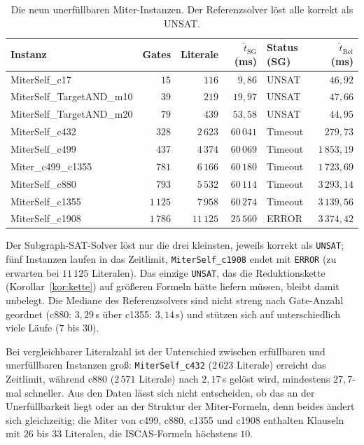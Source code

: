\begin{table}[!ht]
	\centering
	\small
	\begin{tabularx}{\textwidth}{@{}lrrrYr@{}}
		\toprule
		Instanz & Gates & Literale & $\tilde t_{\mathrm{SG}}$ (ms) & Status (SG) & $\tilde t_{\mathrm{Ref}}$ (ms) \\
		\midrule
		MiterSelf\_c17 & $15$ & $116$ & $9{,}86$ & UNSAT & $46{,}92$ \\
		MiterSelf\_TargetAND\_m10 & $39$ & $219$ & $19{,}97$ & UNSAT & $47{,}66$ \\
		MiterSelf\_TargetAND\_m20 & $79$ & $439$ & $53{,}58$ & UNSAT & $44{,}95$ \\
		MiterSelf\_c432 & $328$ & $2\,623$ & $60\,041$ & Timeout & $279{,}73$ \\
		MiterSelf\_c499 & $437$ & $4\,374$ & $60\,069$ & Timeout & $1\,853{,}19$ \\
		Miter\_c499\_c1355 & $781$ & $6\,166$ & $60\,180$ & Timeout & $1\,723{,}69$ \\
		MiterSelf\_c880 & $793$ & $5\,532$ & $60\,114$ & Timeout & $3\,293{,}14$ \\
		MiterSelf\_c1355 & $1\,125$ & $7\,958$ & $60\,274$ & Timeout & $3\,139{,}56$ \\
		MiterSelf\_c1908 & $1\,786$ & $11\,125$ & $25\,560$ & ERROR & $3\,374{,}42$ \\
		\bottomrule
	\end{tabularx}
	\caption{Die neun unerfüllbaren Miter-Instanzen. Der Referenzsolver löst alle korrekt als UNSAT.}
	\label{tab:exp_miter}
\end{table}

Der Subgraph-SAT-Solver löst nur die drei kleinsten, jeweils korrekt als \texttt{UNSAT}; fünf Instanzen laufen in das Zeitlimit, \texttt{MiterSelf\_c1908} endet mit \texttt{ERROR} (zu erwarten bei $11\,125$ Literalen). Das einzige \texttt{UNSAT}, das die Reduktionskette (Korollar~\ref{kor:kette}) auf größeren Formeln hätte liefern müssen, bleibt damit unbelegt. Die Mediane des Referenzsolvers sind nicht streng nach Gate-Anzahl geordnet (c880: $3{,}29$\,s über c1355: $3{,}14$\,s) und stützen sich auf unterschiedlich viele Läufe ($7$ bis $30$).

Bei vergleichbarer Literalzahl ist der Unterschied zwischen erfüllbaren und unerfüllbaren Instanzen groß: \texttt{MiterSelf\_c432} ($2\,623$ Literale) erreicht das Zeitlimit, während c880 ($2\,571$ Literale) nach $2{,}17$\,s gelöst wird, mindestens $27{,}7$-mal schneller. Aus den Daten lässt sich nicht entscheiden, ob das an der Unerfüllbarkeit liegt oder an der Struktur der Miter-Formeln, denn beides ändert sich gleichzeitig; die Miter von c499, c880, c1355 und c1908 enthalten Klauseln mit $26$ bis $33$ Literalen, die ISCAS-Formeln höchstens $10$.


